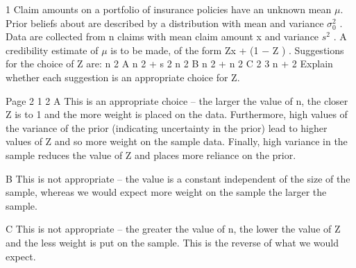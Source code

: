 \documentclass[a4paper,12pt]{article}
\begin{document}
1
Claim amounts on a portfolio of insurance policies have an unknown mean $\mu$. Prior beliefs about \mu are described by a distribution with mean  and variance $\sigma_0^2$ . Data
are collected from n claims with mean claim amount x and variance $s^2$ . A credibility
estimate of $\mu$ is to be made, of the form
Zx + (1 − Z )  .
Suggestions for the choice of Z are:
n  2
A
n  2 + s 2
n  2
B
n  2 + n
 2
C
2
3
n +  2
Explain whether each suggestion is an appropriate choice for Z. 


Page 2%
1
2
A This is an appropriate choice – the larger the value of n, the closer Z is to 1 and the more weight is placed on the data. Furthermore, high values of the variance of the
prior (indicating uncertainty in the prior) lead to higher values of Z and so more weight on the sample data. Finally, high variance in the sample reduces the value of Z
and places more reliance on the prior.

B This is not appropriate – the value is a constant independent of the size of the sample, whereas we would expect more weight on the sample the larger the
sample.

C This is not appropriate – the greater the value of n, the lower the value of Z and the less weight is put on the sample. This is the reverse of what we would
expect.
\end{document}

